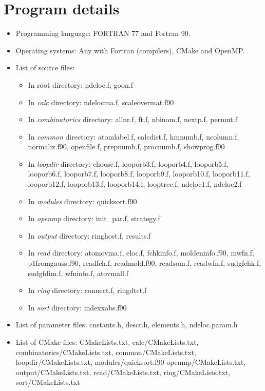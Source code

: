 \documentclass[a4paper,11pt,openany]{memoir}
\begin{document}
\section{Program details}
\begin{itemize}
	\item Programming language: FORTRAN 77 and Fortran 90.
	\item Operating systems: Any with Fortran (compilers), CMake and OpenMP.
	\item List of source files:
			\begin{itemize}
				\item In root directory:
					ndeloc.f,
					goon.f
				\item In \emph{calc} directory:
					ndelocma.f,
					scaleovermat.f90
				\item In \emph{combinatorics} directory:
					allnr.f,
					ft.f,
					nbinom.f,
					nextp.f,
					permut.f
				\item In \emph{common} directory:
					atomlabel.f,
					calcdist.f,
					hmnumb.f,
					ncolumn.f,
					normaliz.f90,
					openfile.f,
					prepnumb.f,
					procnumb.f,
					showprog.f90
				\item In \emph{loopdir} directory:
					choose.f,
					looporb3.f,
					looporb4.f,
					looporb5.f,
					looporb6.f,
					looporb7.f,
					looporb8.f,
					looporb9.f,
					looporb10.f,
					looporb11.f,
					looporb12.f,
					looporb13.f,
					looporb14.f,
					looptree.f,
					ndeloc1.f,
					ndeloc2.f
				\item In \emph{modules} directory:
					quicksort.f90
				\item In \emph{openmp} directory:
					init\_par.f,
					strategy.f
				\item In \emph{output} directory:
					ringhost.f,
					results.f
				\item In \emph{read} directory:
					atomovma.f,
					eloc.f,
					fchkinfo.f,
					moldeninfo.f90,
					mwfn.f,
					p1fromgauss.f90,
					readfch.f,
					readmold.f90,
					readsom.f,
					readwfn.f,
					sudgfchk.f,
					sudgfdim.f,
					wfninfo.f,
					atovmall.f
				\item In \emph{ring} directory:
					connect.f,
					ringdtct.f
				\item In \emph{sort} directory:
					indexxabs.f90
			\end{itemize}
	\item List of parameter files:
					cnstants.h,
					descr.h,
					elements.h,
					ndeloc.param.h
	\item List of CMake files:
					CMakeLists.txt,
					calc/CMakeLists.txt,
					combinatorics/CMakeLists.txt,
					common/CMakeLists.txt,
					loopdir/CMakeLists.txt,
					modules/quicksort.f90
					openmp/CMakeLists.txt,
					output/CMakeLists.txt,
					read/CMakeLists.txt,
					ring/CMakeLists.txt,
					sort/CMakeLists.txt
\end{itemize}
\end{document}

